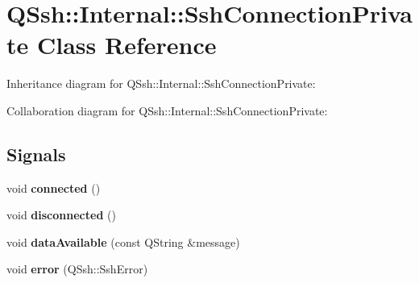 \hypertarget{class_q_ssh_1_1_internal_1_1_ssh_connection_private}{}\section{Q\+Ssh\+:\+:Internal\+:\+:Ssh\+Connection\+Private Class Reference}
\label{class_q_ssh_1_1_internal_1_1_ssh_connection_private}


Inheritance diagram for Q\+Ssh\+:\+:Internal\+:\+:Ssh\+Connection\+Private\+:


Collaboration diagram for Q\+Ssh\+:\+:Internal\+:\+:Ssh\+Connection\+Private\+:
\subsection*{Signals}
\begin{DoxyCompactItemize}
\item 
\mbox{\label{class_q_ssh_1_1_internal_1_1_ssh_connection_private_aa33abdfa4b7cd4c840ee2a60f2b58351}} 
void {\bfseries connected} ()
\item 
\mbox{\label{class_q_ssh_1_1_internal_1_1_ssh_connection_private_a50f7e86f7c7d542f5d6314659d4c3167}} 
void {\bfseries disconnected} ()
\item 
\mbox{\label{class_q_ssh_1_1_internal_1_1_ssh_connection_private_a6c5febe7d61a2bf89d784a5bed9a598e}} 
void {\bfseries data\+Available} (const Q\+String \&message)
\item 
\mbox{\label{class_q_ssh_1_1_internal_1_1_ssh_connection_private_a09bb7669e3f14fb5b2de4a204e48bfe3}} 
void {\bfseries error} (Q\+Ssh\+::\+Ssh\+Error)
\end{DoxyCompactItemize}
